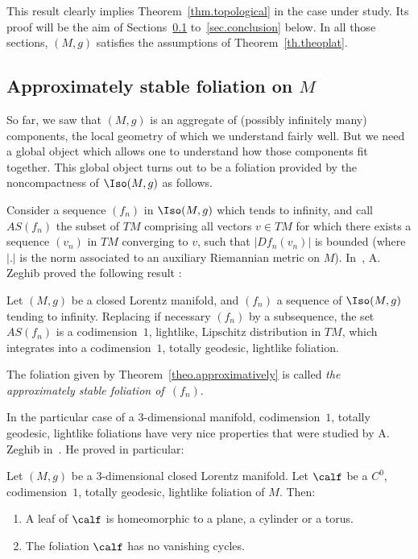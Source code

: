 This result clearly implies Theorem~\ref{thm.topological} in the case under study. Its proof will be the aim of Sections~\ref{sec.approximately} to~\ref{sec.conclusion} below. In all those sections, $(M,g)$ satisfies the assumptions of Theorem~\ref{th.theoplat}.

\subsection{Approximately stable foliation on \texorpdfstring{${M}$}{M}}\label{sec.approximately}
So far, we saw that $(M,g)$ is an aggregate of (possibly infinitely many) components, the local geometry of which we understand fairly well. But we need a global object which allows one to understand how those components fit together. This global object turns out to be a foliation provided by the noncompactness of $\Iso(M,g)$ as follows.



Consider a sequence $(f_n)$ in $\Iso(M,g)$ which tends to infinity, and call $AS(f_n)$ the subset of $TM$ comprising all vectors $v \in TM$ for which there exists a sequence $(v_n)$ in $TM$ converging to $v$, such that $|Df_n(v_n)|$ is bounded (where $|.|$ is the norm associated to an auxiliary Riemannian metric on $M$). In~\cite{zeghibisom1}, A. Zeghib proved the following result :

\begin{theo}\label{theo.approximatively}
Let $(M,g)$ be a closed Lorentz manifold, and $(f_n)$ a sequence of $\Iso(M,g)$ tending to infinity. Replacing if necessary $(f_n)$ by a subsequence, the set $AS(f_n)$ is a codimension~$1$, lightlike, Lipschitz distribution in $TM$, which integrates into a codimension~$1$, totally geodesic, lightlike foliation.
\end{theo}

The foliation given by Theorem~\ref{theo.approximatively} is called \emph{the approximately stable foliation of~$(f_n)$}.

In the particular case of a $3$-dimensional manifold, codimension~$1$, totally geodesic, lightlike foliations have very nice properties that were studied by A. Zeghib in~\cite{zeghibfoliation}. He proved in particular:

\begin{theo}\label{th.zeghibfol}
Let $(M,g)$ be a $3$-dimensional closed Lorentz manifold. Let $\calf$ be a $C^0$, codimension~$1$, totally geodesic, lightlike foliation of $M$. Then:
\begin{enumerate}
\item \label{8.3.1}A leaf of $\calf$ is homeomorphic to a plane, a cylinder or a torus.
\item \label{8.3.2}The foliation $\calf$ has no vanishing cycles.
\end{enumerate}
\end{theo}

